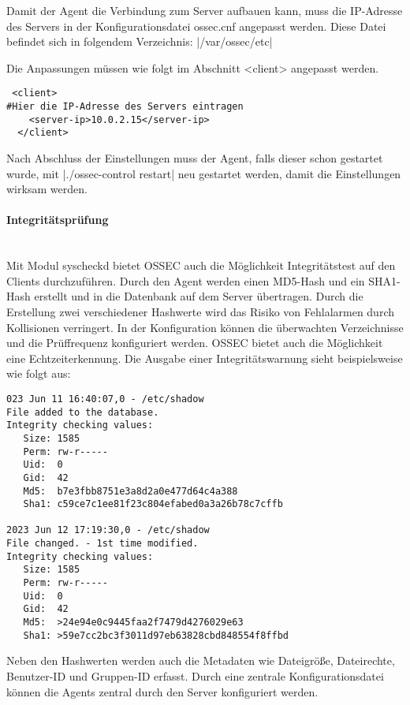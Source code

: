 \noindent Damit der Agent die Verbindung zum Server aufbauen kann, muss die IP-Adresse des Servers in der Konfigurationsdatei ossec.cnf angepasst werden. Diese Datei befindet sich in folgendem Verzeichnis: |/var/ossec/etc| 

\noindent Die Anpassungen müssen wie folgt im Abschnitt <client> angepasst werden.   
\begin{verbatim}
 <client>
#Hier die IP-Adresse des Servers eintragen
    <server-ip>10.0.2.15</server-ip> 
  </client>
\end{verbatim}

\noindent Nach Abschluss der Einstellungen muss der Agent, falls dieser schon gestartet wurde, mit |./ossec-control restart| neu gestartet werden, damit die Einstellungen wirksam werden.

\paragraph{Integritätsprüfung}
\noindent \\Mit Modul syscheckd bietet OSSEC auch die Möglichkeit Integritätstest auf den Clients durchzuführen. Durch den Agent werden einen MD5-Hash und ein SHA1-Hash erstellt und in die Datenbank auf dem Server übertragen. Durch die Erstellung zwei verschiedener Hashwerte wird das Risiko von Fehlalarmen durch Kollisionen verringert. In der Konfiguration können die überwachten Verzeichnisse und die Prüffrequenz konfiguriert werden. OSSEC bietet auch die Möglichkeit eine Echtzeiterkennung. Die Ausgabe einer Integritätswarnung sieht beispielsweise wie folgt aus:
\begin{verbatim}
023 Jun 11 16:40:07,0 - /etc/shadow
File added to the database. 
Integrity checking values:
   Size: 1585
   Perm: rw-r-----
   Uid:  0
   Gid:  42
   Md5:  b7e3fbb8751e3a8d2a0e477d64c4a388
   Sha1: c59ce7c1ee81f23c804efabed0a3a26b78c7cffb

2023 Jun 12 17:19:30,0 - /etc/shadow
File changed. - 1st time modified.
Integrity checking values:
   Size: 1585
   Perm: rw-r-----
   Uid:  0
   Gid:  42
   Md5:  >24e94e0c9445faa2f7479d4276029e63
   Sha1: >59e7cc2bc3f3011d97eb63828cbd848554f8ffbd
\end{verbatim}

\noindent Neben den Hashwerten werden auch die Metadaten wie Dateigröße, Dateirechte, Benutzer-ID und Gruppen-ID erfasst. Durch eine zentrale Konfigurationsdatei können die Agents zentral durch den Server konfiguriert werden. 


  
 

